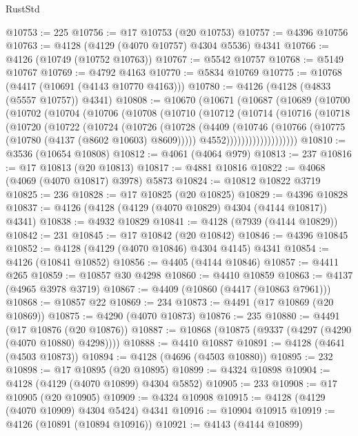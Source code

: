 \begin{lexlean}{RustStd}
\begin{coremodule}
@10753 := 225
@10756 := @17 @10753 (@20 @10753)
@10757 := @4396 @10756
@10763 := @4128 (@4129 (@4070 @10757) @4304 @5536) @4341
@10766 := @4126 (@10749 (@10752 @10763))
@10767 := @5542 @10757
@10768 := @5149 @10767
@10769 := @4792 @4163
@10770 := @5834 @10769
@10775 := @10768 (@4417 (@10691 (@4143 @10770 @4163)))
@10780 := @4126 (@4128 (@4833 (@5557 @10757)) @4341)
@10808 := @10670
    (@10671
      (@10687
        (@10689
          (@10700
            (@10702
              (@10704
                (@10706
                  (@10708
                    (@10710
                      (@10712
                        (@10714
                          (@10716
                            (@10718
                              (@10720
                                (@10722
                                  (@10724
                                    (@10726
                                      (@10728
                                        (@4409
                                          (@10746
                                            (@10766 (@10775 (@10780 (@4137 (@8602 @10603) @8609)))))
                                          @4552)))))))))))))))))))
@10810 := @3536 (@10654 @10808)
@10812 := @4061 (@4064 @979)
@10813 := 237
@10816 := @17 @10813 (@20 @10813)
@10817 := @4881 @10816
@10822 := @4068 (@4069 (@4070 @10817) @3978) @5873
@10824 := @10812 @10822 @3719
@10825 := 236
@10828 := @17 @10825 (@20 @10825)
@10829 := @4396 @10828
@10837 := @4126 (@4128 (@4129 (@4070 @10829) @4304 (@4144 @10817)) @4341)
@10838 := @4932 @10829
@10841 := @4128 (@7939 (@4144 @10829))
@10842 := 231
@10845 := @17 @10842 (@20 @10842)
@10846 := @4396 @10845
@10852 := @4128 (@4129 (@4070 @10846) @4304 @4145) @4341
@10854 := @4126 (@10841 @10852)
@10856 := @4405 (@4144 @10846)
@10857 := @4411 @265
@10859 := @10857 @30 @4298
@10860 := @4410 @10859
@10863 := @4137 (@4965 @3978 @3719)
@10867 := @4409 (@10860 (@4417 (@10863 @7961)))
@10868 := @10857 @22
@10869 := 234
@10873 := @4491 (@17 @10869 (@20 @10869))
@10875 := @4290 (@4070 @10873)
@10876 := 235
@10880 := @4491 (@17 @10876 (@20 @10876))
@10887 := @10868 (@10875 (@9337 (@4297 (@4290 (@4070 @10880) @4298))))
@10888 := @4410 @10887
@10891 := @4128 (@4641 (@4503 @10873))
@10894 := @4128 (@4696 (@4503 @10880))
@10895 := 232
@10898 := @17 @10895 (@20 @10895)
@10899 := @4324 @10898
@10904 := @4128 (@4129 (@4070 @10899) @4304 @5852)
@10905 := 233
@10908 := @17 @10905 (@20 @10905)
@10909 := @4324 @10908
@10915 := @4128 (@4129 (@4070 @10909) @4304 @5424) @4341
@10916 := @10904 @10915
@10919 := @4126 (@10891 (@10894 @10916))
@10921 := @4143 (@4144 @10899)

\end{coremodule}
\end{lexlean}
